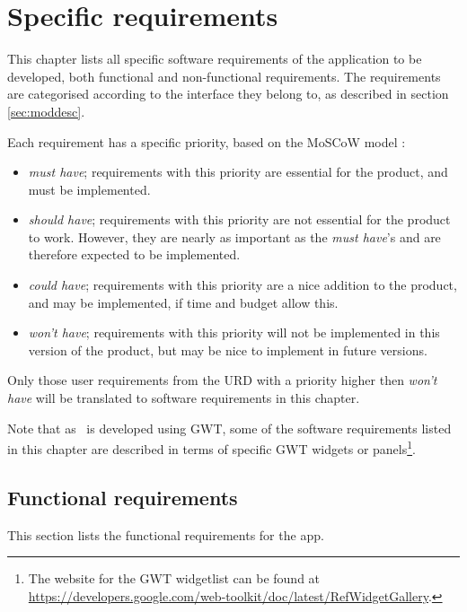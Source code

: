 \chapter{Specific requirements}
\label{chap:specreq}
This chapter lists all specific software requirements of the application to be developed, both functional and non-functional requirements. The requirements are categorised according to the interface they belong to, as described in section \ref{sec:moddesc}.

Each requirement has a specific priority, based on the MoSCoW model \cite{moscow}:

\begin{itemize}
    \item \emph{must have}; requirements with this priority are essential for the product, and must be implemented.
    \item \emph{should have}; requirements with this priority are not essential for the product to work. However, they are nearly as important as the \emph{must have}'s and are therefore expected to be implemented.
    \item \emph{could have}; requirements with this priority are a nice addition to the product, and may be implemented, if time and budget allow this.
    \item \emph{won't have}; requirements with this priority will not be implemented in this version of the product, but may be nice to implement in future versions.
\end{itemize}

Only those user requirements from the URD \cite{urd} with a priority higher then \emph{won't have} will be translated to software requirements in this chapter.

Note that as \applicationname\ is developed using GWT, some of the software requirements listed in this chapter are described in terms of specific GWT widgets or panels\footnote{The website for the GWT widgetlist can be found at \url{https://developers.google.com/web-toolkit/doc/latest/RefWidgetGallery}.}.


\section{Functional requirements}
\label{sec:funcreq}
This section lists the functional requirements for the \projectname app.

